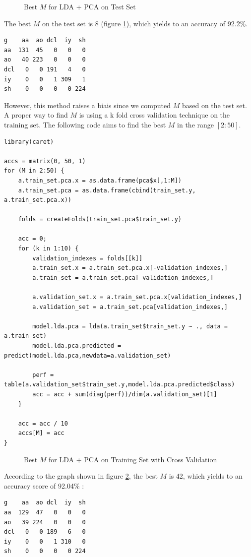 \documentclass[]{report}
\newcommand{\inputtikz}[2]{%
	\scalebox{#1}{}  
}
\begin{document}
\begin{figure}[!hb]
	\centering
	\inputtikz{0.5}{Figures/lda_pca.tex}
	\caption{Best $M$ for LDA + PCA on Test Set}
	\label{fig:lda_pca}
\end{figure}

The best $M$ on the test set is 8 (figure \ref{fig:lda_pca}), which yields to an accuracy of 92.2\%.

\begin{verbatim}
g    aa  ao dcl  iy  sh
aa  131  45   0   0   0
ao   40 223   0   0   0
dcl   0   0 191   4   0
iy    0   0   1 309   1
sh    0   0   0   0 224
\end{verbatim}

 However, this method raises a biais since we computed $M$ based on the test set. A proper way to find $M$ is using a k fold cross validation technique on the training set. The following code aims to find the best $M$ in the range $[2:50]$.

\begin{lstlisting}
library(caret)

accs = matrix(0, 50, 1)
for (M in 2:50) {
	a.train_set.pca.x = as.data.frame(pca$x[,1:M])
	a.train_set.pca = as.data.frame(cbind(train_set.y, a.train_set.pca.x))
	
	folds = createFolds(train_set.pca$train_set.y)
	
	acc = 0;
	for (k in 1:10) {
		validation_indexes = folds[[k]]
		a.train_set.x = a.train_set.pca.x[-validation_indexes,]
		a.train_set = a.train_set.pca[-validation_indexes,]
		
		a.validation_set.x = a.train_set.pca.x[validation_indexes,]
		a.validation_set = a.train_set.pca[validation_indexes,]
		
		model.lda.pca = lda(a.train_set$train_set.y ~ ., data = a.train_set)
		model.lda.pca.predicted = predict(model.lda.pca,newdata=a.validation_set)
		
		perf = table(a.validation_set$train_set.y,model.lda.pca.predicted$class)
		acc = acc + sum(diag(perf))/dim(a.validation_set)[1]
	}

	acc = acc / 10
	accs[M] = acc
}
\end{lstlisting}

\begin{figure}[!hb]
	\centering
	\inputtikz{0.5}{Figures/lda_pca_cv.tex}
	\caption{Best $M$ for LDA + PCA on Training Set with Cross Validation}
	\label{fig:lda_pca_cv}
\end{figure}

According to the graph shown in figure \ref{fig:lda_pca_cv}, the best $M$ is 42, which yields to an accuracy score of 92.04\% :
\begin{verbatim}
g    aa  ao dcl  iy  sh
aa  129  47   0   0   0
ao   39 224   0   0   0
dcl   0   0 189   6   0
iy    0   0   1 310   0
sh    0   0   0   0 224
\end{verbatim}
\end{document}
